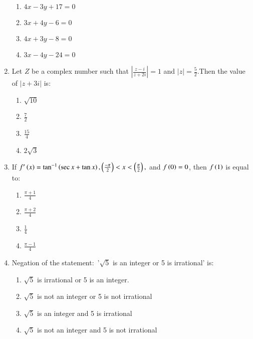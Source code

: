 \documentclass[journal,12pt,twocolumn]{IEEEtran}
\theoremstyle{remark}
\begin{document}
\begin{enumerate}
\begin{enumerate}
    \item $4x-3y+17=0$
    \item $3x+4y-6=0$
    \item $4x+3y-8=0$
    \item $3x-4y-24=0$
\end{enumerate}
\item Let $Z$ be a complex number such that $\left\lvert\frac{z-i}{z+2i}\right\rvert=1$ and $\lvert z \rvert=\frac{5}{2}$.Then the value of $\lvert z+3i\rvert$ is$\colon$
\begin{enumerate}
    \item $\sqrt{10}$
    \item $\frac{7}{2}$
    \item $\frac{15}{4}$
    \item $2\sqrt{3}$
\end{enumerate}
\item If $f^{\prime}\left(x\right)=\tan^{-1}\left(\sec x + \tan x\right),\left(\frac{-\pi}{2}\right)<x<\left(\frac{\pi}{2}\right),$ and $f\left(0\right)=0$, then $f\left(1\right)$ is equal to$\colon$
\begin{enumerate}
    \item $\frac{\pi+1}{4}$
    \item $\frac{\pi+2}{4}$
    \item $\frac{1}{4}$
    \item $\frac{\pi-1}{4}$
\end{enumerate}
\item Negation of the statement$\colon$ '$\sqrt{5}$ is an integer or 5 is irrational' is$\colon$
\begin{enumerate}
    \item $\sqrt{5}$ is irrational or 5 is an integer.
    \item $\sqrt{5}$ is not an integer or 5 is not irrational
    \item $\sqrt{5}$ is an integer and 5 is irrational
    \item $\sqrt{5}$ is not an integer and 5 is not irrational
\end{enumerate}

    







































    
\end{enumerate}
 
\end{document}
